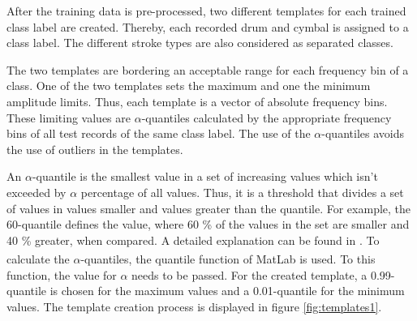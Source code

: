 
After the training data is pre-processed, two different templates for each trained class label are created. Thereby, each recorded drum and cymbal is assigned to a class label. The different stroke types are also considered as separated classes.


The two templates are bordering an acceptable range for each frequency bin of a class. One of the two templates sets the maximum and one the minimum amplitude limits. Thus, each template is a vector of absolute frequency bins. These limiting values are $\alpha$-quantiles calculated by the appropriate frequency bins of all test records of the same class label. The use of the $\alpha$-quantiles avoids the use of outliers in the templates.

An $\alpha$-quantile is the smallest value in a set of increasing values which isn't exceeded by $\alpha$ percentage of all values. Thus, it is a threshold that divides a set of values in values smaller and values greater than the quantile. For example, the 60-quantile defines the value, where 60 \% of the values in the set are smaller and 40 \% greater, when compared. A detailed explanation can be found in \autocite{Hedderich:2012}. To calculate the $\alpha$-quantiles, the quantile function of MatLab\textsuperscript{\textregistered} is used. To this function, the value for $\alpha$ needs to be passed. For the created template, a 0.99-quantile is chosen for the maximum values and a 0.01-quantile for the minimum values. The template creation process is displayed in figure \ref{fig:templates1}.

%

